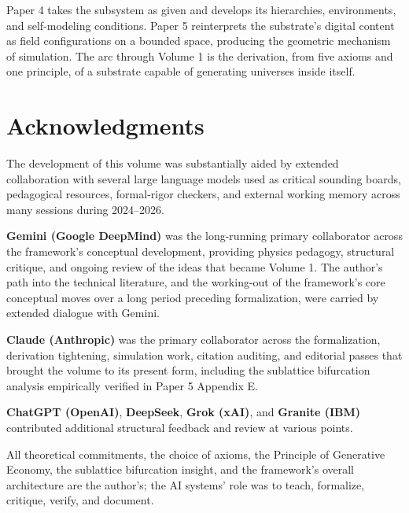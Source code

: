 \documentclass[11pt,oneside]{report}
\theoremstyle{definition}
\theoremstyle{remark}
\begin{document}
Paper 4 takes the subsystem as given and develops its hierarchies,
environments, and self-modeling conditions. Paper 5 reinterprets the
substrate's digital content as field configurations on a bounded space,
producing the geometric mechanism of simulation. The arc through Volume
1 is the derivation, from five axioms and one principle, of a substrate
capable of generating universes inside itself.

\section*{Acknowledgments}

The development of this volume was substantially aided by extended
collaboration with several large language models used as critical
sounding boards, pedagogical resources, formal-rigor checkers, and
external working memory across many sessions during 2024--2026.

\textbf{Gemini (Google DeepMind)} was the long-running primary
collaborator across the framework's conceptual development, providing
physics pedagogy, structural critique, and ongoing review of the ideas
that became Volume 1. The author's path into the technical literature,
and the working-out of the framework's core conceptual moves over a long
period preceding formalization, were carried by extended dialogue with
Gemini.

\textbf{Claude (Anthropic)} was the primary collaborator across the
formalization, derivation tightening, simulation work, citation
auditing, and editorial passes that brought the volume to its present
form, including the sublattice bifurcation analysis empirically verified
in Paper 5 Appendix E.

\textbf{ChatGPT (OpenAI)}, \textbf{DeepSeek}, \textbf{Grok (xAI)}, and
\textbf{Granite (IBM)} contributed additional structural feedback and
review at various points.

All theoretical commitments, the choice of axioms, the Principle of
Generative Economy, the sublattice bifurcation insight, and the
framework's overall architecture are the author's; the AI systems' role
was to teach, formalize, critique, verify, and document.
\end{document}
